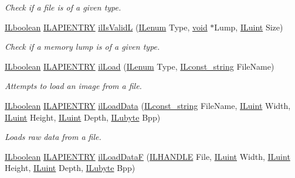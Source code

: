 \begin{DoxyCompactItemize}
\begin{DoxyCompactList}\small\item\em Check if a file is of a given type. \end{DoxyCompactList}\item 
\hyperlink{group__il__types_gaa6aa7c95cfdc06b4d8601ef832b7bb0a}{I\+Lboolean} \hyperlink{_i_l_8h_a69c08a8d06df986f7e46f209d131ef2f}{I\+L\+A\+P\+I\+E\+N\+T\+R\+Y} \hyperlink{group__file_ga6ab6e9cdafb45c65570c5ed5eb0fde57}{il\+Is\+Valid\+L} (\hyperlink{group__il__types_ga62ca73445716183ef42b1f3906a45ed0}{I\+Lenum} Type, \hyperlink{_i_l_8h_a5530e04d947bcddd83639ea7940faf10}{void} $\ast$Lump, \hyperlink{group__il__types_gaff8e86a1072c8d7cfe387fb87c6ed8e1}{I\+Luint} Size)
\begin{DoxyCompactList}\small\item\em Check if a memory lump is of a given type. \end{DoxyCompactList}\item 
\hyperlink{group__il__types_gaa6aa7c95cfdc06b4d8601ef832b7bb0a}{I\+Lboolean} \hyperlink{_i_l_8h_a69c08a8d06df986f7e46f209d131ef2f}{I\+L\+A\+P\+I\+E\+N\+T\+R\+Y} \hyperlink{group__file_ga9972544062275b0cf8f41acef375d88f}{il\+Load} (\hyperlink{group__il__types_ga62ca73445716183ef42b1f3906a45ed0}{I\+Lenum} Type, \hyperlink{group__il__types_ga1aa1edc3eb344e14acacb02bade24a5a}{I\+Lconst\+\_\+string} File\+Name)
\begin{DoxyCompactList}\small\item\em Attempts to load an image from a file. \end{DoxyCompactList}\item 
\hyperlink{group__il__types_gaa6aa7c95cfdc06b4d8601ef832b7bb0a}{I\+Lboolean} \hyperlink{_i_l_8h_a69c08a8d06df986f7e46f209d131ef2f}{I\+L\+A\+P\+I\+E\+N\+T\+R\+Y} \hyperlink{group__file_gaf39ed11daf8c151dff75be87afacdfca}{il\+Load\+Data} (\hyperlink{group__il__types_ga1aa1edc3eb344e14acacb02bade24a5a}{I\+Lconst\+\_\+string} File\+Name, \hyperlink{group__il__types_gaff8e86a1072c8d7cfe387fb87c6ed8e1}{I\+Luint} Width, \hyperlink{group__il__types_gaff8e86a1072c8d7cfe387fb87c6ed8e1}{I\+Luint} Height, \hyperlink{group__il__types_gaff8e86a1072c8d7cfe387fb87c6ed8e1}{I\+Luint} Depth, \hyperlink{group__il__types_ga057357939bc5a12e8061715453568519}{I\+Lubyte} Bpp)
\begin{DoxyCompactList}\small\item\em Loads raw data from a file. \end{DoxyCompactList}\item 
\hyperlink{group__il__types_gaa6aa7c95cfdc06b4d8601ef832b7bb0a}{I\+Lboolean} \hyperlink{_i_l_8h_a69c08a8d06df986f7e46f209d131ef2f}{I\+L\+A\+P\+I\+E\+N\+T\+R\+Y} \hyperlink{group__file_ga50049c04c459b921cafcdd7b837ac8ee}{il\+Load\+Data\+F} (\hyperlink{_i_l_8h_a2e3e6f3fab1fa3764f0802258f702d10}{I\+L\+H\+A\+N\+D\+L\+E} File, \hyperlink{group__il__types_gaff8e86a1072c8d7cfe387fb87c6ed8e1}{I\+Luint} Width, \hyperlink{group__il__types_gaff8e86a1072c8d7cfe387fb87c6ed8e1}{I\+Luint} Height, \hyperlink{group__il__types_gaff8e86a1072c8d7cfe387fb87c6ed8e1}{I\+Luint} Depth, \hyperlink{group__il__types_ga057357939bc5a12e8061715453568519}{I\+Lubyte} Bpp)

\end{DoxyCompactItemize}
